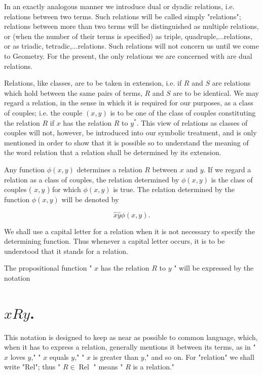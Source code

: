 \documentclass[10pt]{article}
\begin{document}
In an exactly analogous manner we introduce dual or dyadic relations, i.e. relations between two terms. Such relations will be called simply "relations"; relations between more than two terms will be distinguished as multiple relations, or (when the number of their terms is specified) as triple, quadruple,...relations, or as triadic, tetradic,...relations. Such relations will not concern us until we come to Geometry. For the present, the only relations we are concerned with are dual relations.

Relations, like classes, are to be taken in extension, i.e. if $R$ and $S$ are relations which hold between the same pairs of terms, $R$ and $S$ are to be identical. We may regard a relation, in the sense in which it is required for our purposes, as a class of couples; i.e. the couple $(x, y)$ is to be one of the class of couples constituting the relation $R$ if $x$ has the relation $R$ to $y^{*}$. This view of relations as classes of couples will not, however, be introduced into our symbolic treatment, and is only mentioned in order to show that it is possible so to understand the meaning of the word relation that a relation shall be determined by its extension.

Any function $\phi(x, y)$ determines a relation $R$ between $x$ and $y$. If we regard a relation as a class of couples, the relation determined by $\phi(x, y)$ is the class of couples ( $x, y$ ) for which $\phi(x, y)$ is true. The relation determined by the function $\phi(x, y)$ will be denoted by

$$
\hat{x} \hat{y} \phi(x, y) .
$$

We shall use a capital letter for a relation when it is not necessary to specify the determining function. Thus whenever a capital letter occurs, it is to be understood that it stands for a relation.

The propositional function " $x$ has the relation $R$ to $y$ " will be expressed by the notation

\section*{$x R y$.}
This notation is designed to keep as near as possible to common language, which, when it has to express a relation, generally mentions it between its terms, as in " $x$ loves $y$," " $x$ equals $y$," " $x$ is greater than $y$," and so on. For "relation" we shall write "Rel"; thus " $R \in \operatorname{Rel}$ " means " $R$ is a relation."
\end{document}
